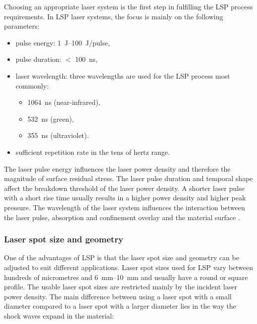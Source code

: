Choosing an appropriate laser system is the first step in fulfilling the LSP process requirements. In LSP laser systems, the focus is mainly on the following parameters:
\begin{itemize}

    \item pulse energy: \SIrange{1}{100}{\joule}/pulse,
    \item pulse duration: $<$ \SI{100}{\nano\second},
    
    \item laser wavelength: three wavelengths are used for the LSP process most commonly:
    
    \begin{itemize}

        \item \SI{1064}{\nano\second} (near-infrared),
        \item \SI{532}{\nano\second} (green),
        \item \SI{355}{\nano\second} (ultraviolet).

    \end{itemize}
    
    \item sufficient repetition rate in the tens of hertz range.

\end{itemize}

The laser pulse energy influences the laser power density and therefore the magnitude of surface residual stress. 
The laser pulse duration and temporal shape affect the breakdown threshold of the laser power density. A shorter laser pulse with a short rise time usually results in a higher power density and higher peak pressure. 
The wavelength of the laser system influences the interaction between the laser pulse, absorption and confinement overlay and the material surface \cite{fabbro_peyre_berthe_scherpereel_1998}. 

\subsubsection*{Laser spot size and geometry}

One of the advantages of LSP is that the laser spot size and geometry can be adjusted to suit different applications. Laser spot sizes used for LSP vary between hundreds of micrometres and \SIrange{6}{10}{\mm} and usually have a round or square profile. The usable laser spot sizes are restricted mainly by the incident laser power density. The main difference between using a laser spot with a small diameter compared to a laser spot with a larger diameter lies in the way the shock waves expand in the material:

